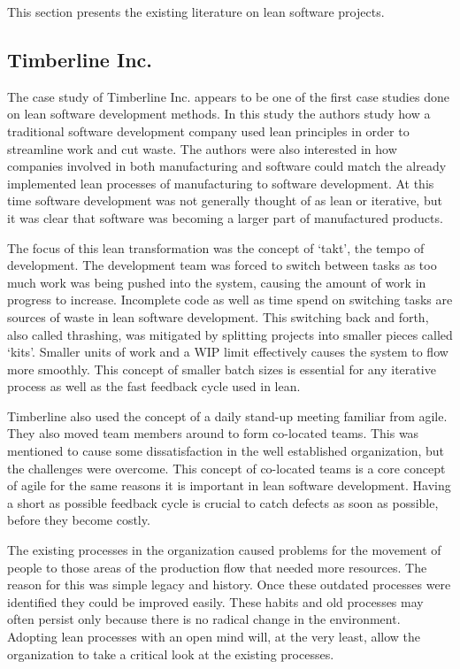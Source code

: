 This section presents the existing literature on lean software projects.\\


\subsection{Timberline Inc.}
\label{timberline}

The case study of Timberline Inc. appears to be one of the first case studies done on lean software development methods. In this study the authors study how a traditional software development company used lean principles in order to streamline work and cut waste. The authors were also interested in how companies involved in both manufacturing and software could match the already implemented lean processes of manufacturing to software development. At this time software development was not generally thought of as lean or iterative, but it was clear that software was becoming a larger part of manufactured products.\cite{Middleton2005Lean}

The focus of this lean transformation was the concept of `takt', the tempo of development. The development team was forced to switch between tasks as too much work was being pushed into the system, causing the amount of work in progress to increase. Incomplete code as well as time spend on switching tasks are sources of waste in lean software development. This switching back and forth, also called thrashing, was mitigated by splitting projects into smaller pieces called `kits'. Smaller units of work and a WIP limit effectively causes the system to flow more smoothly.\cite{Middleton2005Lean} This concept of smaller batch sizes is essential for any iterative process as well as the fast feedback cycle used in lean.

Timberline also used the concept of a daily stand-up meeting familiar from agile. They also moved team members around to form co-located teams. This was mentioned to cause some dissatisfaction in the well established organization, but the challenges were overcome.\cite{Middleton2005Lean} This concept of co-located teams is a core concept of agile for the same reasons it is important in lean software development. Having a short as possible feedback cycle is crucial to catch defects as soon as possible, before they become costly.

The existing processes in the organization caused problems for the movement of people to those areas of the production flow that needed more resources. The reason for this was simple legacy and history. Once these outdated processes were identified they could be improved easily.\cite{Middleton2005Lean} These habits and old processes may often persist only because there is no radical change in the environment. Adopting lean processes with an open mind will, at the very least, allow the organization to take a critical look at the existing processes.

